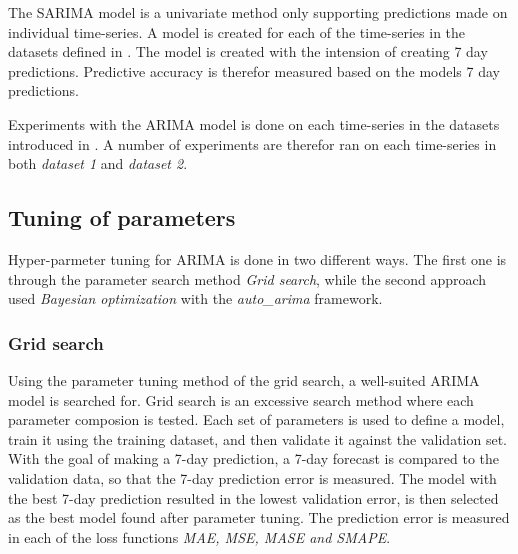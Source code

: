 \fi



\iffalse
  The SARIMA model is a univariate method only supporting predictions made on individual time-series.
  A model is created for each of the time-series in the datasets defined in .
  The model is created with the intension of creating 7 day predictions.
  Predictive accuracy is therefor measured based on the models 7 day predictions.

  Experiments with the ARIMA model is done on each time-series in the datasets introduced in .
  A number of experiments are therefor ran on each time-series in both \textit{dataset 1} and \textit{dataset 2}.


  \iffalse
    ARIMA models are first tuned on each time-series in order to make predicitons.
    The hyper-parmeters fond after the tuning is then used in order to created models capable of making predictions.
    The model attempts to make a 7 day ahead prediction.
  \fi

  \subsection{Tuning of parameters}
  Hyper-parmeter tuning for ARIMA is done in two different ways.
  The first one is through the parameter search method \textit{Grid search},
  while the second approach used \textit{Bayesian optimization} with the \textit{auto\_arima} framework.

  \subsubsection*{Grid search}
  Using the parameter tuning method of the grid search, a well-suited ARIMA model is searched for.
  Grid search is an excessive search method where each parameter composion is tested.
  Each set of parameters is used to define a model, train it using the training dataset,
  and then validate it against the validation set.
  With the goal of making a 7-day prediction, a 7-day forecast is compared to the validation data,
  so that the 7-day prediction error is measured.
  The model with the best 7-day prediction resulted in the lowest validation error,
  is then selected as the best model found after parameter tuning.
  The prediction error is measured in each of the loss functions \textit{MAE, MSE, MASE and SMAPE}.

